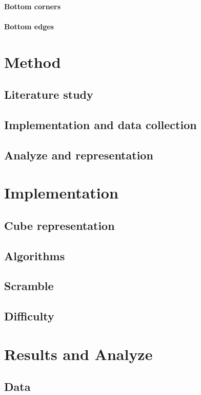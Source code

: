 \documentclass[a4paper,11pt]{kth-mag}
\begin{document}
\subsubsection{Bottom corners}
\subsubsection{Bottom edges}

\chapter{Method}

\section{Literature study}
\section{Implementation and data collection}
\section{Analyze and representation}


\chapter{Implementation}
\section{Cube representation}
\section{Algorithms}
\section{Scramble}
\section{Difficulty}

\chapter{Results and Analyze}

\section{Data}
\end{document}
